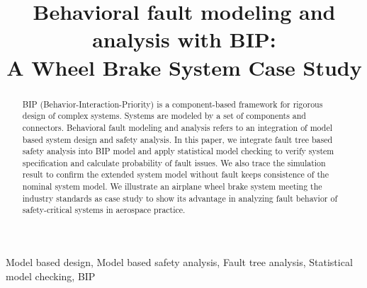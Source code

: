 \documentclass[conference]{IEEEtran}
\begin{document}
\title{Behavioral fault modeling and analysis with BIP:\\
	A Wheel Brake System Case Study\\}

\author{
\and
{}
\and
{}
}

\maketitle

\begin{abstract}
BIP (Behavior-Interaction-Priority) is a component-based framework for rigorous design of complex systems. 
 Systems are modeled by a set of components and connectors.
 Behavioral fault modeling and analysis refers to an integration of model based system design and safety analysis. 
 In this paper, we integrate fault tree based safety analysis into BIP model and 
 apply statistical model checking to verify system specification and calculate probability of fault issues. 
 We also trace the simulation result to confirm the extended system model without fault keeps consistence of the nominal system model.
 We illustrate an airplane wheel brake system meeting the industry standards as case study 
 to show its advantage in analyzing fault behavior of safety-critical systems in aerospace practice.
\end{abstract}

\begin{IEEEkeywords}
Model based design, Model based safety analysis, Fault tree analysis, Statistical model checking, BIP
\end{IEEEkeywords}
\end{document}
